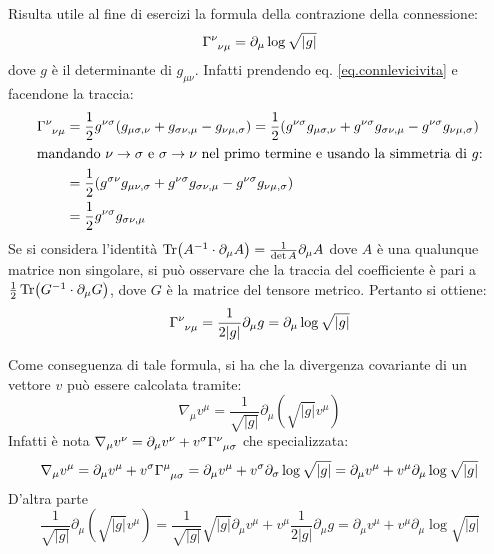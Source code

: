 Risulta utile al fine di esercizi la formula della contrazione della connessione:
\begin{equation}
    \tensor{\Gamma}{^\nu_{\nu\mu}} = \partial_\mu \log\sqrt{|g|}
    \label{eq.traccia_christoffel}
\end{equation}
dove $g$ è il determinante di $g_{\mu\nu}$. Infatti prendendo eq. \ref{eq.connlevicivita} e facendone la traccia:
\begin{align*}
    \tensor{\Gamma}{^\nu_{\nu\mu}} &= \frac{1}{2} g^{\nu\sigma}( g_{\mu\sigma,\nu} + g_{\sigma\nu,\mu} - g_{\nu\mu,\sigma})
    =\frac{1}{2}( g^{\nu\sigma} g_{\mu\sigma,\nu} +g^{\nu\sigma} g_{\sigma\nu,\mu} - g^{\nu\sigma}g_{\nu\mu,\sigma})\\
    \intertext{mandando $\nu\rightarrow\sigma$ e $\sigma\rightarrow\nu$ nel primo termine e usando la simmetria di $g$:}
    &=\frac{1}{2}(g^{\sigma\nu}g_{\mu\nu,\sigma} + g^{\nu\sigma} g_{\sigma\nu,\mu} - g^{\nu\sigma}g_{\nu\mu,\sigma}) \\
    &= \frac{1}{2}g^{\nu\sigma}g_{\sigma\nu,\mu}
\end{align*}
Se si considera l'identità $\Tr(A^{-1}\cdot\partial_\mu A)=\frac{1}{\det A}\partial_\mu A$ dove $A$ è una qualunque matrice non singolare, si può osservare che la traccia del coefficiente è pari a $\frac{1}{2}\Tr(G^{-1}\cdot\partial_\mu G)$, dove $G$ è la matrice del tensore metrico. Pertanto si ottiene:
\begin{equation*}
    \tensor{\Gamma}{^\nu_{\nu\mu}} = \frac{1}{2|g|}\partial_\mu g = \partial_\mu \log\sqrt{|g|}
\end{equation*}

Come conseguenza di tale formula, si ha che la divergenza covariante di un vettore $v$ può essere calcolata tramite:
\begin{equation*}
    \nabla_\mu v^\mu = \frac{1}{\sqrt{|g|}}\partial_\mu(\sqrt{|g|}v^\mu)
\end{equation*}
Infatti è nota $\nabla_\mu v^\nu = \partial_\mu v^\nu + v^\sigma\tensor{\Gamma}{^\nu_{\mu\sigma}}$ che specializzata:
\begin{align*}
    \nabla_\mu v^\mu = \partial_\mu v^\mu + v^\sigma\tensor{\Gamma}{^\mu_{\mu\sigma}} = \partial_\mu v^\mu + v^\sigma\partial_\sigma \log\sqrt{|g|} = \partial_\mu v^\mu + v^\mu \partial_\mu \log\sqrt{|g|}
\end{align*}
D'altra parte
\begin{equation*}
    \frac{1}{\sqrt{|g|}} \partial_\mu (\sqrt{|g|} v^\mu )= \frac{1}{\sqrt{|g|}}\sqrt{|g|}\partial_\mu v^\mu + v^\mu \frac{1}{2|g|}\partial_\mu g = \partial_\mu v^\mu + v^\mu\partial_\mu \log\sqrt{|g|}
\end{equation*}

